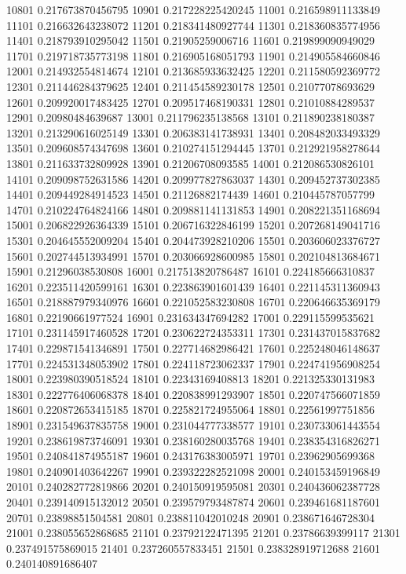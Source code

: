 {10801 0.217673870456795
10901 0.217228225420245
11001 0.216598911133849
11101 0.216632643238072
11201 0.218341480927744
11301 0.218360835774956
11401 0.218793910295042
11501 0.21905259006716
11601 0.219899090949029
11701 0.219718735773198
11801 0.216905168051793
11901 0.214905584660846
12001 0.214932554814674
12101 0.213685933632425
12201 0.211580592369772
12301 0.211446284379625
12401 0.211454589230178
12501 0.21077078693629
12601 0.209920017483425
12701 0.209517468190331
12801 0.21010884289537
12901 0.20980484639687
13001 0.211796235138568
13101 0.211890238180387
13201 0.213290616025149
13301 0.206383141738931
13401 0.208482033493329
13501 0.209608574347698
13601 0.210274151294445
13701 0.212921958278644
13801 0.211633732809928
13901 0.21206708093585
14001 0.212086530826101
14101 0.209098752631586
14201 0.209977827863037
14301 0.209452737302385
14401 0.209449284914523
14501 0.21126882174439
14601 0.210445787057799
14701 0.210224764824166
14801 0.209881141131853
14901 0.208221351168694
15001 0.206822926364339
15101 0.206716322846199
15201 0.207268149041716
15301 0.204645552009204
15401 0.204473928210206
15501 0.203606023376727
15601 0.202744513934991
15701 0.203066928600985
15801 0.202104813684671
15901 0.21296038530808
16001 0.217513820786487
16101 0.224185666310837
16201 0.223511420599161
16301 0.223863901601439
16401 0.221145311360943
16501 0.218887979340976
16601 0.221052583230808
16701 0.220646635369179
16801 0.22190661977524
16901 0.231634347694282
17001 0.229115599535621
17101 0.231145917460528
17201 0.230622724353311
17301 0.231437015837682
17401 0.229871541346891
17501 0.227714682986421
17601 0.225248046148637
17701 0.224531348053902
17801 0.224118723062337
17901 0.224741956908254
18001 0.223980390518524
18101 0.22343169408813
18201 0.221325330131983
18301 0.222776406068378
18401 0.220838991293907
18501 0.220747566071859
18601 0.220872653415185
18701 0.225821724955064
18801 0.22561997751856
18901 0.231549637835758
19001 0.231044777338577
19101 0.230733061443554
19201 0.238619873746091
19301 0.238160280035768
19401 0.238354316826271
19501 0.240841874955187
19601 0.243176383005971
19701 0.23962905699368
19801 0.240901403642267
19901 0.239322282521098
20001 0.240153459196849
20101 0.240282772819866
20201 0.240150919595081
20301 0.240436062387728
20401 0.239140915132012
20501 0.239579793487874
20601 0.239461681187601
20701 0.23898851504581
20801 0.238811042010248
20901 0.238671646728304
21001 0.238055652868685
21101 0.23792122471395
21201 0.23786639399117
21301 0.237491575869015
21401 0.237260557833451
21501 0.238328919712688
21601 0.240140891686407
}
